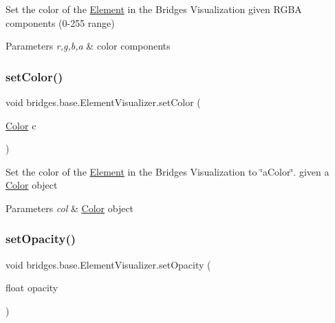 Set the color of the \hyperlink{classbridges_1_1base_1_1_element}{Element} in the Bridges Visualization given R\+G\+BA components (0-\/255 range)


\begin{DoxyParams}{Parameters}
{\em r,g,b,a} & color components \\
\hline
\end{DoxyParams}
\hypertarget{classbridges_1_1base_1_1_element_visualizer_a33172ab908f3b6f9740727b0bfe91565}{}\label{classbridges_1_1base_1_1_element_visualizer_a33172ab908f3b6f9740727b0bfe91565} 
\subsubsection{\texorpdfstring{set\+Color()}{setColor()}\hspace{0.1cm}{\footnotesize\ttfamily [3/3]}}
{\footnotesize\ttfamily void bridges.\+base.\+Element\+Visualizer.\+set\+Color (\begin{DoxyParamCaption}\item[{\hyperlink{classbridges_1_1base_1_1_color}{Color}}]{c }\end{DoxyParamCaption})}

Set the color of the \hyperlink{classbridges_1_1base_1_1_element}{Element} in the Bridges Visualization to \char`\"{}a\+Color\char`\"{}. given a \hyperlink{classbridges_1_1base_1_1_color}{Color} object


\begin{DoxyParams}{Parameters}
{\em col} & \hyperlink{classbridges_1_1base_1_1_color}{Color} object \\
\hline
\end{DoxyParams}
\hypertarget{classbridges_1_1base_1_1_element_visualizer_a932f62eb1bd0c92da265a7f903dd0790}{}\label{classbridges_1_1base_1_1_element_visualizer_a932f62eb1bd0c92da265a7f903dd0790} 
\subsubsection{\texorpdfstring{set\+Opacity()}{setOpacity()}}
{\footnotesize\ttfamily void bridges.\+base.\+Element\+Visualizer.\+set\+Opacity (\begin{DoxyParamCaption}\item[{float}]{opacity }\end{DoxyParamCaption})}

